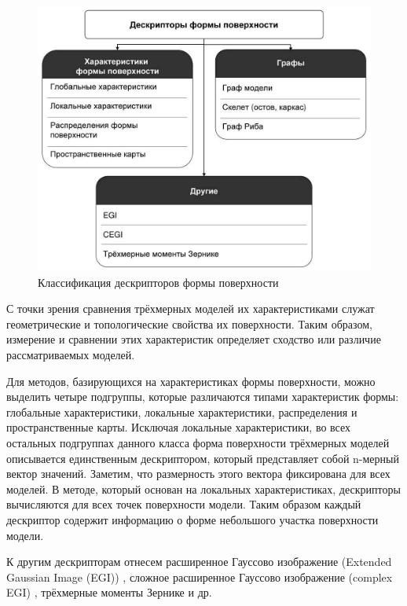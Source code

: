 \documentclass[14pt]{article}
\numberwithin{figure}{section}
\numberwithin{equation}{section}
\begin{document}
\begin{figure}[h]
	\begin{center}
		\includegraphics[scale=0.46]{1.JPG}
		\caption{Классификация дескрипторов формы поверхности}
		\label{ris:1}
	\end{center}
\end{figure}

С точки зрения сравнения трёхмерных моделей их характеристиками служат геометрические и топологические свойства их поверхности. Таким образом, измерение и сравнении этих характеристик определяет сходство или различие рассматриваемых моделей.

Для методов, базирующихся на характеристиках формы поверхности, можно выделить четыре подгруппы, которые различаются типами характеристик формы: глобальные характеристики, локальные характеристики, распределения и пространственные карты. Исключая локальные характеристики, во всех остальных подгруппах данного класса форма поверхности трёхмерных моделей описывается единственным дескриптором, который представляет собой n-мерный вектор значений. Заметим, что размерность этого вектора фиксирована для всех моделей. В методе, который основан на локальных характеристиках, дескрипторы вычисляются для всех точек поверхности модели. Таким образом каждый дескриптор содержит информацию о форме небольшого участка поверхности модели.

К другим дескрипторам отнесем расширенное Гауссово изображение (Extended Gaussian Image (EGI)) \cite{Horn}, сложное расширенное Гауссово изображение (complex EGI) \cite{Kang}, трёхмерные моменты Зернике \cite{Novotni} и др.
\end{document}
